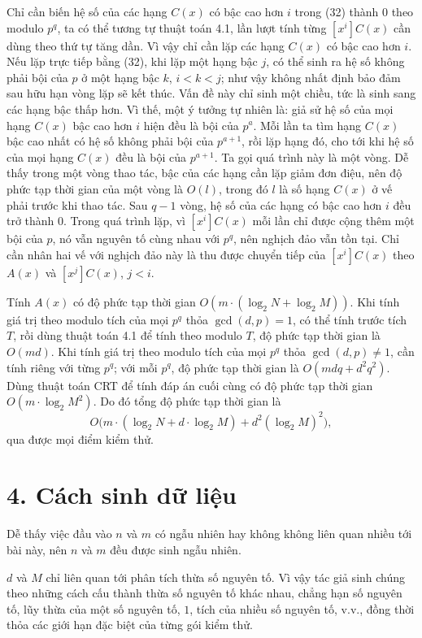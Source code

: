 \documentclass[11pt]{article}
\begin{document}
Chỉ cần biến hệ số của các hạng \(C(x)\) có bậc cao hơn \(i\) trong (32)
thành \(0\) theo modulo \(p^q\), ta có thể tương tự thuật toán 4.1, lần lượt
tính từng \([x^i]C(x)\) cần dùng theo thứ tự tăng dần. Vì vậy chỉ cần lặp các
hạng \(C(x)\) có bậc cao hơn \(i\). Nếu lặp trực tiếp bằng (32), khi lặp một
hạng bậc \(j\), có thể sinh ra hệ số không phải bội của \(p\) ở một hạng bậc
\(k\), \(i<k<j\); như vậy không nhất định bảo đảm sau hữu hạn vòng lặp sẽ kết
thúc. Vấn đề này chỉ sinh một chiều, tức là sinh sang các hạng bậc thấp hơn.
Vì thế, một ý tưởng tự nhiên là: giả sử hệ số của mọi hạng \(C(x)\) bậc cao
hơn \(i\) hiện đều là bội của \(p^a\). Mỗi lần ta tìm hạng \(C(x)\) bậc cao
nhất có hệ số không phải bội của \(p^{a+1}\), rồi lặp hạng đó, cho tới khi hệ
số của mọi hạng \(C(x)\) đều là bội của \(p^{a+1}\). Ta gọi quá trình này là
một vòng. Dễ thấy trong một vòng thao tác, bậc của các hạng cần lặp giảm đơn
điệu, nên độ phức tạp thời gian của một vòng là \(O(l)\), trong đó \(l\) là
số hạng \(C(x)\) ở vế phải trước khi thao tác. Sau \(q-1\) vòng, hệ số của
các hạng có bậc cao hơn \(i\) đều trở thành \(0\). Trong quá trình lặp, vì
\([x^i]C(x)\) mỗi lần chỉ được cộng thêm một bội của \(p\), nó vẫn nguyên tố
cùng nhau với \(p^q\), nên nghịch đảo vẫn tồn tại. Chỉ cần nhân hai vế với
nghịch đảo này là thu được chuyển tiếp của \([x^i]C(x)\) theo \(A(x)\) và
\([x^j]C(x)\), \(j<i\).

Tính \(A(x)\) có độ phức tạp thời gian
\(O(m\cdot(\log_2 N+\log_2 M))\). Khi tính giá trị theo modulo tích của mọi
\(p^q\) thỏa \(\gcd(d,p)=1\), có thể tính trước tích \(T\), rồi dùng thuật
toán 4.1 để tính theo modulo \(T\), độ phức tạp thời gian là \(O(md)\). Khi
tính giá trị theo modulo tích của mọi \(p^q\) thỏa \(\gcd(d,p)\ne1\), cần
tính riêng với từng \(p^q\); với mỗi \(p^q\), độ phức tạp thời gian là
\(O(mdq+d^2q^2)\). Dùng thuật toán CRT để tính đáp án cuối cùng có độ phức
tạp thời gian \(O(m\cdot\log_2 M^2)\). Do đó tổng độ phức tạp thời gian là
\[
  O\bigl(m\cdot(\log_2 N+d\cdot\log_2 M)+d^2(\log_2 M)^2\bigr),
\]
qua được mọi điểm kiểm thử.

\section*{4. Cách sinh dữ liệu}

Dễ thấy việc đầu vào \(n\) và \(m\) có ngẫu nhiên hay không không liên quan
nhiều tới bài này, nên \(n\) và \(m\) đều được sinh ngẫu nhiên.

\(d\) và \(M\) chỉ liên quan tới phân tích thừa số nguyên tố. Vì vậy tác giả
sinh chúng theo những cách cấu thành thừa số nguyên tố khác nhau, chẳng hạn
số nguyên tố, lũy thừa của một số nguyên tố, \(1\), tích của nhiều số nguyên
tố, v.v., đồng thời thỏa các giới hạn đặc biệt của từng gói kiểm thử.
\end{document}

